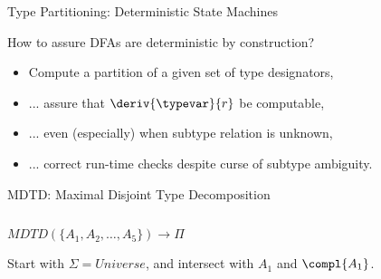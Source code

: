 {  %
\begin{frame}{ Type Partitioning: Deterministic State Machines}

  How to assure DFAs are deterministic by construction?

  \begin{itemize}
  \item   Compute a  partition of a given set of type designators,
  \item   ... assure that $\deriv{\typevar}{r}$ be computable,
  \item   ... even (especially) when subtype relation is unknown,
  \item   ... correct run-time checks despite curse of subtype ambiguity.
  \end{itemize}

\end{frame}
}



\begin{frame}{MDTD: Maximal Disjoint Type Decomposition}
  \begin{columns}
    \begin{column}{0.5\textwidth}
    \end{column}
    \begin{column}{0.5\textwidth}
    \end{column}
  \end{columns}
\end{frame}









\begin{frame}[t]{$MDTD( \{A_1, A_2, \ldots, A_5\})\to\Pi$}
  \scalebox{2.0}{\usebox\boxforestE}
  
  \medskip
  
  Start with $\Sigma=Universe$, and intersect with $A_1$ and $\compl{A_1}$.
\end{frame}



